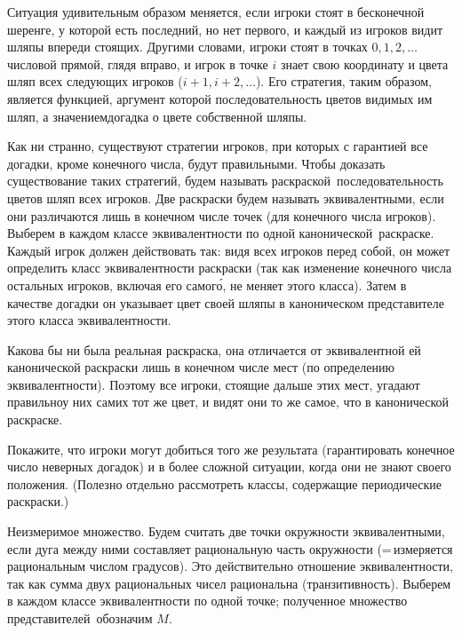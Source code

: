 Ситуация удивительным образом меняется, если игроки стоят
в бесконечной шеренге, у которой есть последний, но нет первого,
и каждый из игроков видит шляпы впереди стоящих.
Другими словами, игроки стоят в точках $0,1,2,\ldots$ числовой
прямой, глядя вправо, и игрок в точке $i$ знает свою координату
и цвета шляп всех следующих игроков ($i+1,i+2,\ldots$). Его
стратегия, таким образом, является функцией, аргумент которой\т
последовательность цветов видимых им шляп, а значением\т догадка
о цвете собственной шляпы.

Как ни странно, существуют стратегии игроков, при которых с
гарантией все догадки, кроме конечного числа, будут правильными.
Чтобы доказать существование таких стратегий, будем называть 
раскраской\ последовательность цветов шляп всех игроков. Две
раскраски будем называть эквивалентными, если они различаются
лишь в конечном числе точек (для конечного числа игроков).
Выберем в каждом классе эквивалентности по одной 
канонической\ раскраске. Каждый игрок должен действовать так:
видя всех игроков перед собой, он может определить класс
эквивалентности раскраски (так как изменение конечного числа
остальных игроков, включая его самог\'о, не меняет этого
класса). Затем в качестве догадки он указывает цвет своей шляпы
в каноническом представителе этого класса эквивалентности.

Какова бы ни была реальная раскраска, она отличается от
эквивалентной ей канонической раскраски лишь в конечном числе
мест (по определению эквивалентности). Поэтому все
игроки, стоящие дальше этих мест, угадают правильно\т у них
самих тот же цвет, и видят они то же самое, что в канонической
раскраске.

\begin{problem}
Покажите, что игроки могут добиться того же результата
(гарантировать конечное число неверных догадок) и в более
сложной ситуации, когда они не знают своего положения. (Полезно
отдельно рассмотреть классы, содержащие периодические
раскраски.)
\end{problem}


\textsf{Неизмеримое множество}. Будем считать две точки
окружности эквивалентными, если дуга между ними составляет
рациональную часть окружности (=\,измеряется рациональным числом
градусов). Это действительно отношение эквивалентности, так как
сумма двух рациональных чисел рациональна (транзитивность).
Выберем в каждом классе эквивалентности по одной точке;
полученное множество  представителей\ обозначим $M$.

